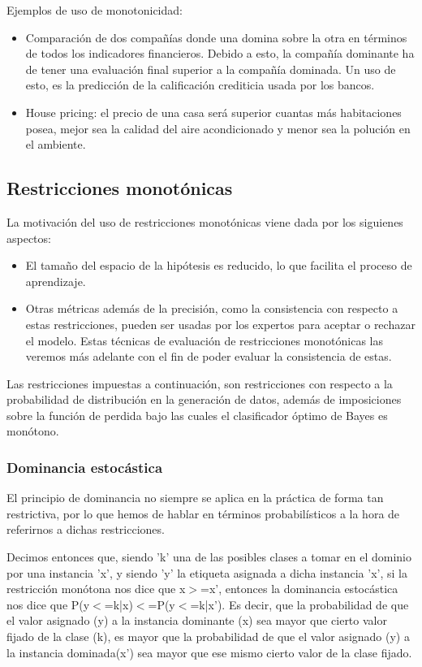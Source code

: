 Ejemplos de uso de monotonicidad:
\begin{itemize}
	\item Comparación de dos compañías donde una domina sobre la otra en términos de
	todos los indicadores financieros. Debido a esto, la compañía dominante
	ha de tener una evaluación final superior a la compañía dominada. Un uso
	de esto, es la predicción de la calificación crediticia usada por los bancos.
	\item House pricing: el precio de una casa será superior cuantas más habitaciones
	posea, mejor sea la calidad del aire acondicionado y menor sea la polución
	en el ambiente.
\end{itemize}



\subsection{Restricciones monotónicas}

La motivación del uso de restricciones monotónicas viene dada por los siguienes aspectos:
\begin{itemize}
	\item El tamaño del espacio de la hipótesis es reducido, lo que facilita el
	proceso de aprendizaje. 
	\item Otras métricas además de la precisión, como la consistencia con respecto
	a estas restricciones, pueden ser usadas por los expertos para aceptar
	o rechazar el modelo. Estas técnicas de evaluación de restricciones
	monotónicas las veremos más adelante con el fin de poder evaluar 
	la consistencia de estas.
\end{itemize}

Las restricciones impuestas a continuación, son restricciones con respecto a la probabilidad de distribución en la generación de 
datos, además de imposiciones sobre la función de perdida bajo las cuales
el clasificador óptimo de Bayes es monótono.

\subsubsection{Dominancia estocástica}

El principio de dominancia no siempre
se aplica en la práctica de forma tan restrictiva, por lo que hemos de 
hablar en términos probabilísticos a la hora de referirnos a dichas
restricciones.

Decimos entonces que, siendo 'k' una de las posibles clases a tomar en el 
dominio por una instancia 'x', y siendo 'y' la etiqueta asignada a dicha
instancia 'x', si la restricción monótona nos dice que x$>$=x', entonces
la dominancia estocástica nos dice que P(y$<$=k|x)$<$=P(y$<$=k|x').
Es decir, que la probabilidad de que el valor asignado (y) a la instancia 
dominante (x) sea mayor que cierto valor fijado de la clase (k), es mayor
que la probabilidad de que el valor asignado (y) a la instancia dominada(x')
sea mayor que ese mismo cierto valor de la clase fijado.


